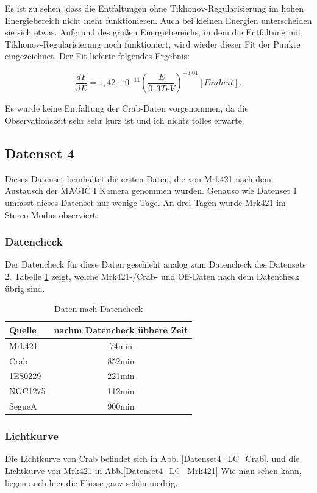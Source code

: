 Es ist zu sehen, dass die Entfaltungen ohne Tikhonov-Regularisierung im hohen Energiebereich nicht mehr funktionieren.
Auch bei kleinen Energien unterscheiden sie sich etwas.
Aufgrund des großen Energiebereichs, in dem die Entfaltung mit Tikhonov-Regularisierung noch funktioniert, wird wieder dieser Fit der Punkte eingezeichnet.
Der Fit lieferte folgendes Ergebnis:

\begin{equation}
 \frac{dF}{dE}=1,42 \cdot 10^{-11}\left( \frac{E}{0,3 \si{TeV}} \right)^{-3.01} [Einheit].
\end{equation}

Es wurde keine Entfaltung der Crab-Daten vorgenommen, da die Observationszeit sehr sehr kurz ist und ich nichts tolles erwarte.

\FloatBarrier

\subsection{Datenset 4}
\label{subsec:Datenset_4}
Dieses Datenset beinhaltet die ersten Daten, die von Mrk421 nach dem Austausch der MAGIC I Kamera genommen wurden. 
Genauso wie Datenset 1 umfasst dieses Datenset nur wenige Tage. 
An drei Tagen wurde Mrk421 im Stereo-Modus observiert. 

\subsubsection{Datencheck}
Der Datencheck für diese Daten geschieht analog zum Datencheck des Datensets 2. 
Tabelle \ref{tab:Datenset4} zeigt, welche Mrk421-/Crab- und Off-Daten nach dem Datencheck übrig sind.

\begin{table}[!h]
\centering
\caption{Daten nach Datencheck}
\label{tab:Datenset4}
\begin{tabular}{lc}
  \toprule
  Quelle & nachm Datencheck übbere Zeit\\
  \midrule
  \midrule
  Mrk421 & 74min\\
  \midrule
  Crab & 852min\\
  \midrule
  1ES0229 & 221min \\
  NGC1275 & 112min \\
  SegueA & 900min  \\
  \bottomrule
  \bottomrule
\end{tabular}
\end{table}

\subsubsection{Lichtkurve}
Die Lichtkurve von Crab befindet sich in Abb. \ref{Datenset4_LC_Crab}.
und die Lichtkurve von Mrk421 in Abb.\ref{Datenset4_LC_Mrk421} 
Wie man sehen kann, liegen auch hier die Flüsse ganz schön niedrig.

